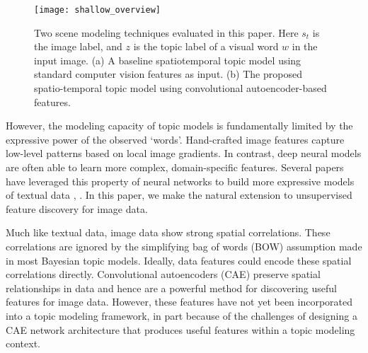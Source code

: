 \documentclass[letterpaper, 10 pt, conference]{ieeeconf}
\begin{document}
\begin{figure}[t]
    \centering
    \texttt{[image: shallow\_overview]}
    \caption{Two scene modeling techniques evaluated in this paper. Here $s_t$ is the image label, and $z$ is the topic label of a visual word $w$ in the input image. (a) A baseline spatiotemporal topic model using standard computer vision features as input. (b) The proposed  spatio-temporal topic model using convolutional autoencoder-based features.}
    \label{fig:overview}
    \vspace{-.105in} 
\end{figure}
    
However, the modeling capacity of topic models is fundamentally limited by the expressive power of the observed `words'. Hand-crafted image features capture low-level patterns based on local image gradients. In contrast, deep neural models are often able to learn more complex, domain-specific features. Several papers have leveraged this property of neural networks to build more expressive models of textual data \cite{Mikolov2012}, \cite{Shen2014}.  In this paper, we make the natural extension to unsupervised feature discovery for image data. 

Much like textual data, image data show strong spatial correlations. These correlations are ignored by the simplifying bag of words (BOW) assumption made in most Bayesian topic models. Ideally, data features could encode these spatial correlations directly. Convolutional autoencoders (CAE) \cite{Masci} preserve spatial relationships in data and hence are a powerful method for discovering useful features for image data. However, these features have not yet been incorporated into a topic modeling framework, in part because of the challenges of designing a CAE network architecture that produces useful features within a topic modeling context. 

\end{document}

